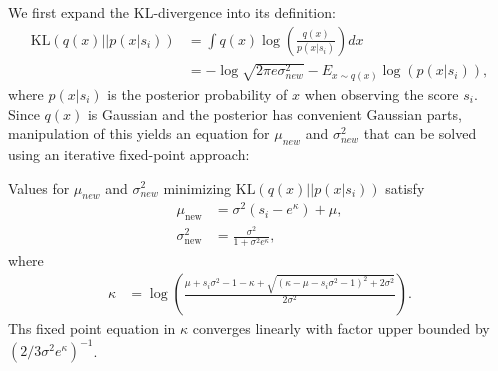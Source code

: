 We first expand the KL-divergence into its definition:
\begin{align}\label{eq:KL}
    \text{KL}\left(q(x)|| p(x|s_i)\right) &= \int q(x) \log \left( \frac{q(x)}{p(x|s_i)} \right) dx \nonumber \\
     \qquad &= -\log\sqrt{2\pi e \sigma_{new}^2} - E_{x\sim q(x)} \log \left( p(x|s_i) \right),
\end{align}
\unindentmore where $p(x|s_i)$ is the posterior probability of $x$ when
observing the score $s_i$. Since $q(x)$ is Gaussian
and the posterior has convenient Gaussian parts, manipulation of this
yields an equation for $\mu_{new}$ and $\sigma_{new}^2$ that can be
solved using an iterative fixed-point approach:
\begin{lemma}
Values for $\mu_{new}$ and $\sigma_{new}^2$
minimizing $\text{KL}\left(q(x)|| p(x|s_i)\right)$
satisfy
\begin{align}\label{eq:ExactMuSigmaNew}
    \mu_{\text{new}} & = \sigma^{2}\left(s_i - e^\kappa\right) + \mu, \nonumber \\
   \sigma_{\text{new}}^2 & = \frac{\sigma^2}{1+\sigma^2 e^\kappa },
\end{align}
where
\begin{align}\label{eq:approximationZQuad5}
     \kappa  &= \log\left(\frac{\mu + s_i\sigma^2-1-\kappa+\sqrt{(\kappa - \mu - s_i\sigma^2 -1)^2+2\sigma^2}}{2\sigma^2}\right).
\end{align}
Ths fixed point equation in $\kappa$ converges linearly
with factor upper bounded by 
$\left( 2/3 \sigma^2 e^\kappa \right)^{-1}$.
\end{lemma}
